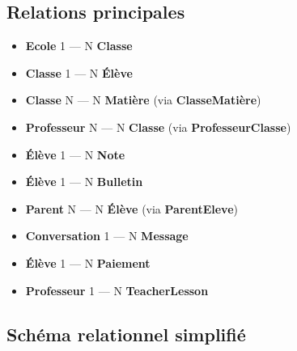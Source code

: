 \documentclass[12pt,a4paper,twoside]{report}
\begin{document}
\subsection{Relations principales}

\begin{itemize}
    \item \textbf{Ecole} 1 --- N \textbf{Classe}
    \item \textbf{Classe} 1 --- N \textbf{Élève}
    \item \textbf{Classe} N --- N \textbf{Matière} (via \textbf{ClasseMatière})
    \item \textbf{Professeur} N --- N \textbf{Classe} (via \textbf{ProfesseurClasse})
    \item \textbf{Élève} 1 --- N \textbf{Note}
    \item \textbf{Élève} 1 --- N \textbf{Bulletin}
    \item \textbf{Parent} N --- N \textbf{Élève} (via \textbf{ParentEleve})
    \item \textbf{Conversation} 1 --- N \textbf{Message}
    \item \textbf{Élève} 1 --- N \textbf{Paiement}
    \item \textbf{Professeur} 1 --- N \textbf{TeacherLesson}
\end{itemize}

\subsection{Schéma relationnel simplifié}
\end{document}
